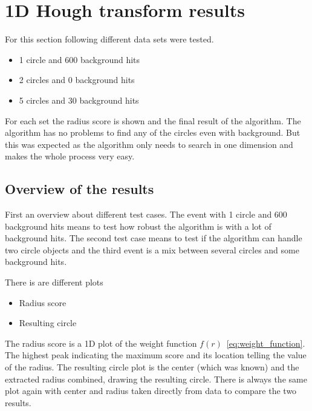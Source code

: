 \documentclass[11pt,twoside]{scrreprt}
\begin{document}
\section{1D Hough transform results} %
\label{sec:1d_hough_transform_results}
For this section following different data sets were tested.
\begin{itemize}
  \item 1 circle and 600 background hits
  \item 2 circles and 0 background hits
  \item 5 circles and 30 background hits
\end{itemize}

For each set the radius score is shown and the final result of the algorithm.
The algorithm has no problems to find any of the circles even with background.
But this was expected as the algorithm only needs to search in one dimension
and makes the whole process very easy.

\subsection{Overview of the results} %
\label{sub:1d_overview_of_the_results}
First an overview about different test cases. The event with 1 circle and 600
background hits means to test how robust the algorithm is with a lot of
background hits. The second test case means to test if the algorithm can 
handle two circle objects and the third event is a mix between several
circles and some background hits.

There is are different plots
\begin{itemize}
  \item Radius score
  \item Resulting circle
\end{itemize}

The radius score is a 1D plot of the weight function $f(r)$~\ref{eq:weight_function}. The highest peak
indicating the maximum score and its location telling the value of the radius.
The resulting circle plot is the center (which was known) and the extracted radius combined, drawing the resulting circle. There is always the same plot
again with center and radius taken directly from data to compare the two results.
\end{document}
